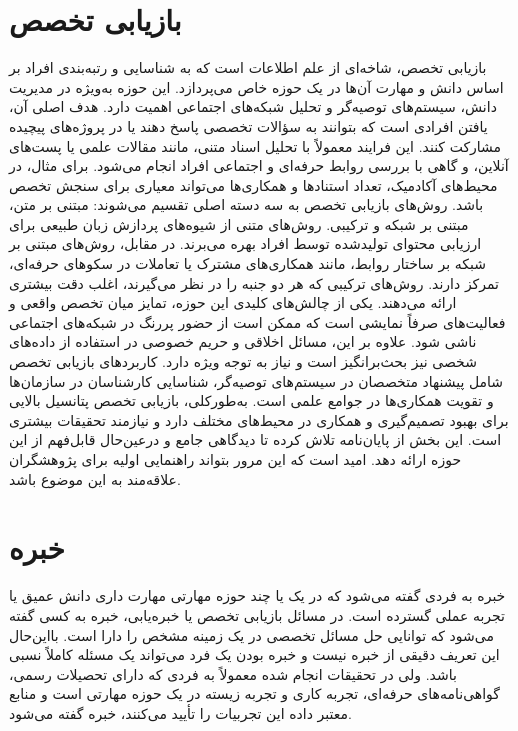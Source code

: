 \section{بازیابی‌ تخصص}
بازیابی تخصص، شاخه‌ای از علم اطلاعات است که به شناسایی و رتبه‌بندی افراد بر اساس دانش و مهارت آن‌ها در یک حوزه خاص می‌پردازد. این حوزه به‌ویژه در مدیریت دانش، سیستم‌های توصیه‌گر و تحلیل شبکه‌های اجتماعی اهمیت دارد. هدف اصلی آن، یافتن افرادی است که بتوانند به سؤالات تخصصی پاسخ دهند یا در پروژه‌های پیچیده مشارکت کنند. این فرایند معمولاً با تحلیل اسناد متنی، مانند مقالات علمی یا پست‌های آنلاین، و گاهی با بررسی روابط حرفه‌ای و اجتماعی افراد انجام می‌شود. برای مثال، در محیط‌های آکادمیک، تعداد استنادها و همکاری‌ها می‌تواند معیاری برای سنجش تخصص باشد. روش‌های بازیابی تخصص به سه دسته اصلی تقسیم می‌شوند: مبتنی بر متن، مبتنی بر شبکه و ترکیبی. روش‌های متنی از شیوه‌های پردازش زبان طبیعی برای ارزیابی محتوای تولیدشده توسط افراد بهره می‌برند. در مقابل، روش‌های مبتنی بر شبکه بر ساختار روابط، مانند همکاری‌های مشترک یا تعاملات در سکو‌های حرفه‌ای، تمرکز دارند. روش‌های ترکیبی که هر دو جنبه را در نظر می‌گیرند، اغلب دقت بیشتری ارائه می‌دهند. یکی از چالش‌های کلیدی این حوزه، تمایز میان تخصص واقعی و فعالیت‌های صرفاً نمایشی است که ممکن است از حضور پررنگ در شبکه‌های اجتماعی ناشی شود. علاوه بر این، مسائل اخلاقی و حریم خصوصی در استفاده از داده‌های شخصی نیز بحث‌برانگیز است و نیاز به توجه ویژه دارد. کاربردهای بازیابی تخصص شامل پیشنهاد متخصصان در سیستم‌های توصیه‌گر، شناسایی کارشناسان در سازمان‌ها و تقویت همکاری‌ها در جوامع علمی است.
به‌طورکلی، بازیابی تخصص پتانسیل بالایی برای بهبود تصمیم‌گیری و همکاری در محیط‌های مختلف دارد و نیازمند تحقیقات بیشتری است. این بخش از پایان‌نامه تلاش کرده تا دیدگاهی جامع و درعین‌حال قابل‌فهم از این حوزه ارائه دهد. امید است که این مرور بتواند راهنمایی اولیه برای پژوهشگران علاقه‌مند به این موضوع باشد\cite{balog_expertise_2012}.

\section{خبره}
خبره به فردی گفته می‌شود که در یک یا چند حوزه مهارتی مهارت داری دانش عمیق یا تجربه عملی گسترده است. در مسائل بازیابی تخصص یا خبره‌یابی، خبره به کسی گفته می‌شود که توانایی حل مسائل تخصصی در یک زمینه مشخص را دارا است. بااین‌حال این تعریف دقیقی از خبره نیست و خبره بودن یک فرد می‌تواند یک مسئله کاملاً نسبی باشد. ولی در تحقیقات انجام شده معمولاً به فردی که دارای تحصیلات رسمی، گواهی‌نامه‌های حرفه‌ای، تجربه کاری و تجربه زیسته در یک حوزه مهارتی است و منابع معتبر داده این تجربیات را تأیید می‌کنند، خبره گفته می‌شود\cite{diaz_what_2024}.

